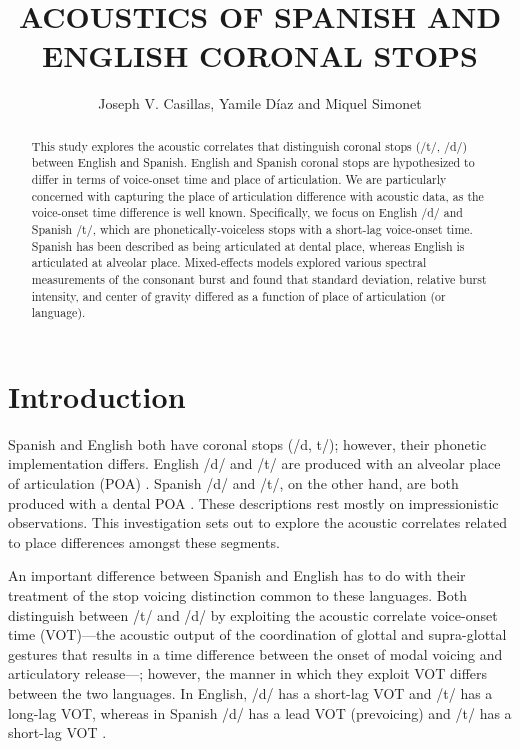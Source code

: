 \documentclass[a4paper,11pt,twocolumn]{article}
\title{ACOUSTICS OF SPANISH AND ENGLISH CORONAL STOPS}
\author{Joseph V. Casillas, Yamile D\'{i}az and Miquel Simonet}
\begin{document}
\maketitle

\begin{abstract}
This study explores the acoustic correlates that distinguish coronal stops (/t/, /d/) between English and Spanish. English and Spanish coronal stops are hypothesized to differ in terms of voice-onset time and place of articulation. We are particularly concerned with capturing the place of articulation difference with acoustic data, as the voice-onset time difference is well known. Specifically, we focus on English /d/ and Spanish /t/, which are phonetically-voiceless stops with a short-lag voice-onset time. Spanish  has been described as being articulated at dental place, whereas English  is articulated at alveolar place. Mixed-effects models explored various spectral measurements of the consonant burst and found that standard deviation, relative burst intensity, and center of gravity differed as a function of place of articulation (or language).
\end{abstract}


\section{Introduction}

Spanish and English both have coronal stops (/d, t/); however, their phonetic implementation differs. English /d/ and /t/ are produced with an alveolar place of articulation (POA) \cite{picard1987introduction}. Spanish /d/ and /t/, on the other hand, are both produced with a dental POA \cite{hualde2005sounds}. These descriptions rest mostly on impressionistic observations. This investigation sets out to explore the acoustic correlates related to place differences amongst these segments.

An important difference between Spanish and English has to do with their treatment of the stop voicing distinction common to these languages. Both distinguish between /t/ and /d/ by exploiting the acoustic correlate voice-onset time (VOT)---the acoustic output of the coordination of glottal and supra-glottal gestures that results in a time difference between the onset of modal voicing and articulatory release---; however, the manner in which they exploit VOT differs between the two languages. In English, /d/ has a short-lag VOT and /t/ has a long-lag VOT, whereas in Spanish /d/ has a lead VOT (prevoicing) and /t/ has a short-lag VOT \cite{liskerAbramson1964, williamsModification1979}.
\end{document}

